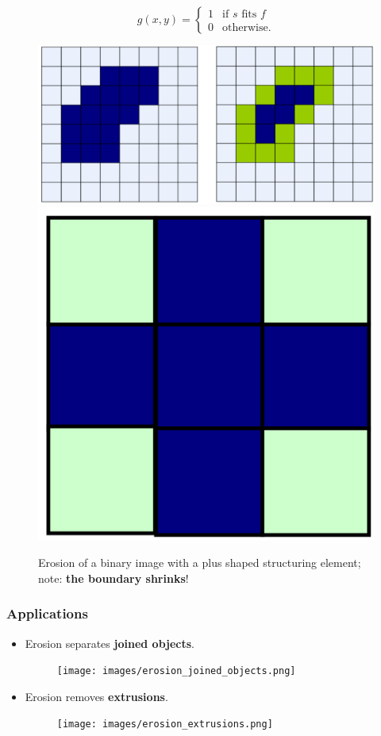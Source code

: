 \begin{equation*}
  g(x, y) =
  \begin{cases}
    1 & \text{if } s \text{ fits } f\\
    0 & \text{otherwise}.
  \end{cases}
\end{equation*}

\begin{figure}[H]
  \centering
  \includegraphics[width=\linewidth]{images/erosion.png}
  \includegraphics[width=0.18\linewidth]{images/erosion_structuring_element.png}
  \caption{Erosion of a binary image with a plus shaped structuring element; note: \textbf{the boundary shrinks}!}
\end{figure}

\subsubsection*{Applications}

\begin{itemize}
  \item Erosion separates \textbf{joined objects}.

    \begin{minipage}{\linewidth}
      \begin{figure}[H]
        \centering
        \texttt{[image: images/erosion\_joined\_objects.png]}
      \end{figure}
    \end{minipage}

  \item Erosion removes \textbf{extrusions}.

    \begin{minipage}{\linewidth}
      \begin{figure}[H]
        \centering
        \texttt{[image: images/erosion\_extrusions.png]}
      \end{figure}
    \end{minipage}
\end{itemize}    

